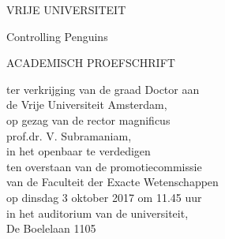 \begin{titlepage}



%
%
%


%
%


\begin{center}
	VRIJE UNIVERSITEIT

	\vspace{1cm}

	Controlling Penguins

	\vspace{2cm}

	ACADEMISCH PROEFSCHRIFT

	\vspace{0.5cm}

\begin{minipage}{0.65\textwidth}
\centering
ter verkrijging van de graad Doctor aan\\
de Vrije Universiteit Amsterdam,\\
op gezag van de rector magnificus\\
prof.dr. V. Subramaniam,\\
in het openbaar te verdedigen\\
ten overstaan van de promotiecommissie\\
van de Faculteit der Exacte Wetenschappen\\
op dinsdag 3 oktober 2017 om 11.45 uur\\
in het auditorium van de universiteit,\\
De Boelelaan 1105
\end{minipage}\\[3cm]


\end{center}
\end{titlepage}
